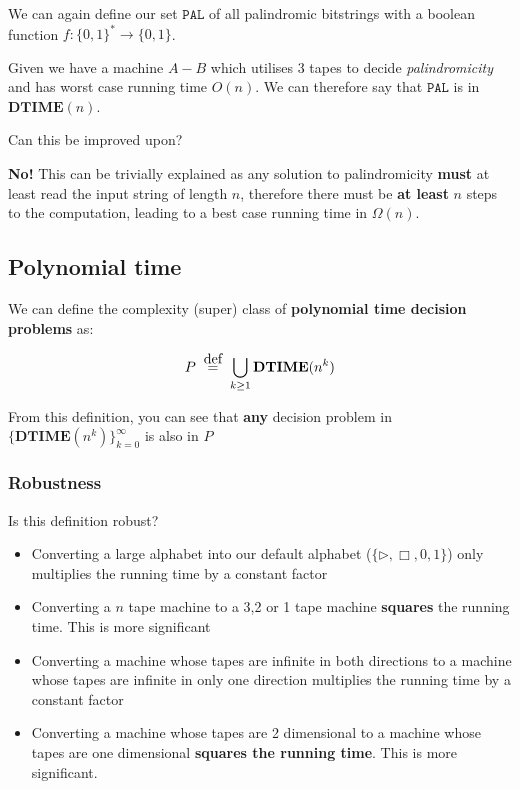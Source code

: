 \documentclass{article}
\newcommand{\defeq}{\stackrel{\mathclap{\normalfont\mbox{def}}}{=}}
\begin{document}
We can again define our set $\texttt{PAL} $ of all palindromic bitstrings with a boolean function $f: \{ 0,1 \}^{*}\rightarrow \{ 0,1 \} $.

Given we have a machine $A-B$ which utilises 3 tapes to decide \textit{palindromicity}  and has worst case running time $O(n)$. We can therefore say that $\texttt{PAL} $ is in $\mathbf{DTIME} (n)$.

Can this be improved upon?

\textbf{No!} This can be trivially explained as any solution to palindromicity \textbf{must} at least read the input string of length $n$, therefore there must be \textbf{at least} $n$ steps to the computation, leading to a best case running time in $\Omega(n)$.

\subsection{Polynomial time}

We can define the complexity (super) class of \textbf{polynomial time decision problems} as:

\[
  P \;\; \defeq \;\; \bigcup_{k\geq1}\mathbf{DTIME} (n^{k})
\]

From this definition, you can see that \textbf{any} decision problem in $\{  \mathbf{DTIME} (n^{k})\}_{k=0}^{\infty} $ is also in $P$

\subsubsection{Robustness}

Is this definition robust?

\begin{itemize}
  \item Converting a large alphabet into our default alphabet ($\{ \rhd, \Box, 0,1 \} $) only multiplies the running time by a constant factor
  \item Converting a $n$ tape machine to a 3,2 or 1 tape machine \textbf{squares} the running time. This is more significant
  \item Converting a machine whose tapes are infinite in both directions to a machine whose tapes are infinite in only one direction multiplies the running time by a constant factor
        \item Converting a machine whose tapes are 2 dimensional to a machine whose tapes are one dimensional \textbf{squares the running time}. This is more significant.
\end{itemize}
\end{document}
